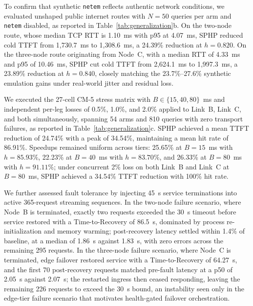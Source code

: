 \documentclass[conference,a4paper]{IEEEtran}
\begin{document}
To confirm that synthetic \texttt{netem} reflects authentic network conditions, we evaluated unshaped public internet routes with $N=50$ queries per arm and \texttt{netem} disabled, as reported in Table~\ref{tab:generalization}b. On the two-node route, whose median TCP RTT is 1.10~ms with p95 at 4.07~ms, SPHP reduced cold TTFT from 1{,}730.7~ms to 1{,}308.6~ms, a 24.39\% reduction at $h=0.820$. On the three-node route originating from Node~C, with a median RTT of 4.33~ms and p95 of 10.46~ms, SPHP cut cold TTFT from 2{,}624.1~ms to 1{,}997.3~ms, a 23.89\% reduction at $h=0.840$, closely matching the 23.7\%--27.6\% synthetic emulation gains under real-world jitter and residual loss.

We executed the 27-cell CM-5 stress matrix with $B \in \{15, 40, 80\}$~ms and independent per-leg losses of 0.5\%, 1.0\%, and 2.0\% applied to Link~B, Link~C, and both simultaneously, spanning 54 arms and 810 queries with zero transport failures, as reported in Table~\ref{tab:generalization}c. SPHP achieved a mean TTFT reduction of 24.74\% with a peak of 34.54\%, maintaining a mean hit rate of 86.91\%. Speedups remained uniform across tiers: 25.65\% at $B=15$~ms with $h=85.93\%$, 22.23\% at $B=40$~ms with $h=83.70\%$, and 26.33\% at $B=80$~ms with $h=91.11\%$; under concurrent 2\% loss on both Link~B and Link~C at $B=80$~ms, SPHP achieved a 34.54\% TTFT reduction with 100\% hit rate.

We further assessed fault tolerance by injecting 45~s service terminations into active 365-request streaming sequences. In the two-node failure scenario, where Node~B is terminated, exactly two requests exceeded the 30~s timeout before service restored with a Time-to-Recovery of 86.5~s, dominated by process re-initialization and memory warming; post-recovery latency settled within 1.4\% of baseline, at a median of 1.86~s against 1.83~s, with zero errors across the remaining 295 requests. In the three-node failure scenario, where Node~C is terminated, edge failover restored service with a Time-to-Recovery of 64.27~s, and the first 70 post-recovery requests matched pre-fault latency at a p50 of 2.05~s against 2.07~s; the restarted ingress then ceased responding, leaving the remaining 226 requests to exceed the 30~s bound, an instability seen only in the edge-tier failure scenario that motivates health-gated failover orchestration.

\end{document}
